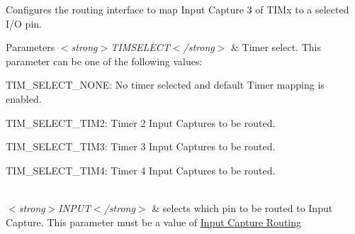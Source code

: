 Configures the routing interface to map Input Capture 3 of T\-I\-Mx to a selected I/\-O pin. 


\begin{DoxyParams}{Parameters}
{\em $<$strong$>$\-T\-I\-M\-S\-E\-L\-E\-C\-T$<$/strong$>$} & Timer select. This parameter can be one of the following values\-: \begin{DoxyItemize}
\item T\-I\-M\-\_\-\-S\-E\-L\-E\-C\-T\-\_\-\-N\-O\-N\-E\-: No timer selected and default Timer mapping is enabled. \item T\-I\-M\-\_\-\-S\-E\-L\-E\-C\-T\-\_\-\-T\-I\-M2\-: Timer 2 Input Captures to be routed. \item T\-I\-M\-\_\-\-S\-E\-L\-E\-C\-T\-\_\-\-T\-I\-M3\-: Timer 3 Input Captures to be routed. \item T\-I\-M\-\_\-\-S\-E\-L\-E\-C\-T\-\_\-\-T\-I\-M4\-: Timer 4 Input Captures to be routed. \end{DoxyItemize}
\\
\hline
{\em $<$strong$>$\-I\-N\-P\-U\-T$<$/strong$>$} & selects which pin to be routed to Input Capture. This parameter must be a value of \hyperlink{group___r_i___input_capture_routing}{Input Capture Routing} \\
\hline
\end{DoxyParams}

